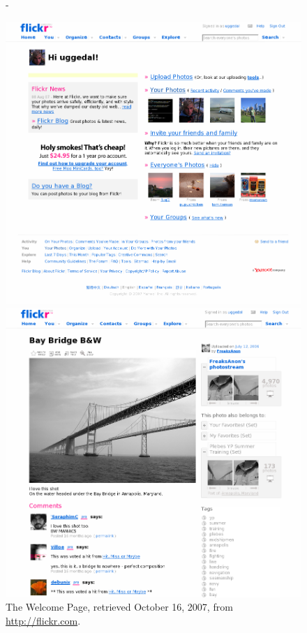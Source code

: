 \begin{figure}[b]
  \captionstyle{\raggedright}
  \centering
  \strictpagechecktrue
  \begin{adjustwidth*}{0em}{-\wholemargin}
    \begin{minipage}[t]{0.475\wholewidth}
      \includegraphics[width=\textwidth]{scrsh_flickr_welcome}
      \caption[Flickr Welcome Page]{%
         The Welcome Page,
         retrieved October 16, 2007, from \url{http://flickr.com}.}
      \label{figure:scrsh.flickr.welcome}
    \end{minipage}
    \hfill
    \begin{minipage}[t]{0.475\wholewidth}
      \includegraphics[width=\textwidth]{scrsh_flickr_photo_detail}

\end{minipage}
\end{adjustwidth*}
\end{figure}
